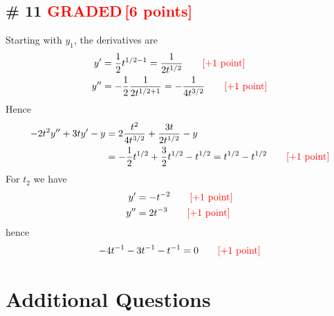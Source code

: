 \documentclass[12pt,letterpaper]{exam}
\newcommand{\grade}{\textcolor{red}{GRADED}}
\newcommand{\pts}[1]{\textcolor{red}{[#1]}}
\begin{document}
\subsection*{\# 11 \grade \,\pts{6 points}}
Starting with $y_1$, the derivatives are
\begin{align}
y' &= \frac{1}{2}t^{1/2-1} = \frac{1}{2t^{1/2}} \quad\quad \text{\pts{+1 point}}\\
y'' &= -\frac{1}{2} \frac{1}{2t^{1/2+1}} = -\frac{1}{4t^{3/2}} \quad\quad \text{\pts{+1 point}}
\end{align}
Hence 
\begin{align}
-2t^2y'' + 3ty' - y &= 2\frac{t^2}{4t^{3/2}}  +\frac{3t}{2t^{1/2}} - y\\
&= -\frac{1}{2}t^{1/2} + \frac{3}{2}t^{1/2} - t^{1/2} = t^{1/2} - t^{1/2} \quad\quad \text{\pts{+1 point}}
\end{align}
For $t_2$ we have
\begin{align}
y' &=-t^{-2}  \quad\quad \text{\pts{+1 point}}\\
y'' &= 2 t^{-3} \quad\quad \text{\pts{+1 point}}
\end{align}
hence 
\begin{align}
-4t^{-1} - 3t^{-1}- t^{-1} = 0  \quad\quad \text{\pts{+1 point}}
\end{align}


\section*{Additional Questions}

\end{document}
